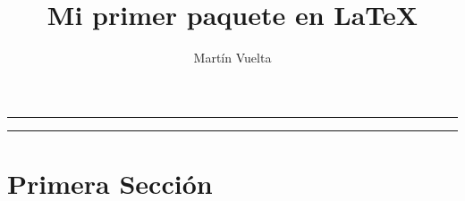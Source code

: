 \documentclass[12pt]{article}
\makeatletter
\renewcommand{\maketitle}{
  {
    \centering
      {\huge
        \textbf{
          \textsc{
            \@title
          }
        }
        \par
      }
      \vspace{-3px}
      \rule{\textwidth}{2pt}\par
      \vspace{-9px}
      \rule{0.8\textwidth}{1pt}\par
      \vspace{18pt}
      {
        \large
          \textit{
            \@author
          }
        \par
      }
      \vspace{18pt}
  }
}
\makeatother
\begin{document}
  \title{Mi primer paquete en \LaTeX}
  \author{Martín Vuelta}
  \maketitle

  \section{Primera Sección}
    \lipsum[1]
\end{document}
